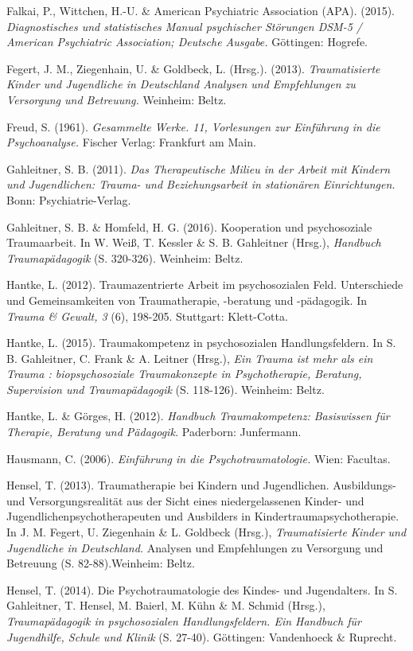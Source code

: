 \hang
Falkai, P., Wittchen, H.-U. \& American Psychiatric Association (APA). (2015). \textit{Diagnostisches und statistisches Manual psychischer Störungen DSM-5 / American Psychiatric Association; Deutsche Ausgabe.} G{\"o}ttingen: Hogrefe.

\hang
Fegert, J. M., Ziegenhain, U. \& Goldbeck, L. (Hrsg.). (2013). \textit{Traumatisierte Kinder und Jugendliche in Deutschland Analysen und Empfehlungen zu Versorgung und Betreuung.} Weinheim: Beltz.

\hang
Freud, S. (1961). \textit{Gesammelte Werke. 11, Vorlesungen zur Einführung in die Psychoanalyse.} Fischer Verlag: Frankfurt am Main.

\hang
Gahleitner, S. B. (2011). \textit{Das Therapeutische Milieu in der Arbeit mit Kindern und Jugendlichen: Trauma- und Beziehungsarbeit in stationären Einrichtungen.} Bonn: Psychiatrie-Verlag.

\hang
Gahleitner, S. B. \& Homfeld, H. G. (2016). Kooperation und psychosoziale Traumaarbeit. In W. Weiß, T. Kessler \& S. B. Gahleitner (Hrsg.), \textit{Handbuch Traumapädagogik} (S. 320-326). Weinheim: Beltz.

\hang
Hantke, L. (2012). Traumazentrierte Arbeit im psychosozialen Feld. Unterschiede und Gemeinsamkeiten von Traumatherapie, -beratung und -pädagogik. In \textit{Trauma \& Gewalt, 3} (6), 198-205. Stuttgart: Klett-Cotta.

\hang
Hantke, L. (2015). Traumakompetenz in psychosozialen Handlungsfeldern. In S. B. Gahleitner, C. Frank \& A. Leitner (Hrsg.), \textit{Ein Trauma ist mehr als ein Trauma : biopsychosoziale Traumakonzepte in Psychotherapie, Beratung, Supervision und Traumapädagogik} (S. 118-126). Weinheim: Beltz.

\hang
Hantke, L. \& Görges, H. (2012). \textit{Handbuch Traumakompetenz: Basiswissen für Therapie, Beratung und Pädagogik.} Paderborn: Junfermann.

\hang
Hausmann, C. (2006). \textit{Einführung in die Psychotraumatologie.} Wien: Facultas.

\hang
Hensel, T. (2013). Traumatherapie bei Kindern und Jugendlichen. Ausbildungs- und Versorgungsrealit{\"a}t aus der Sicht eines niedergelassenen Kinder- und Jugendlichenpsychotherapeuten und Ausbilders in Kindertraumapsychotherapie. In J. M. Fegert, U. Ziegenhain \& L. Goldbeck (Hrsg.), \textit{Traumatisierte Kinder und Jugendliche in Deutschland.} Analysen und Empfehlungen zu Versorgung und Betreuung (S. 82-88).Weinheim: Beltz.

\hang
Hensel, T. (2014). Die Psychotraumatologie des Kindes- und Jugendalters. In S. Gahleitner, T. Hensel, M. Baierl, M. K{\"u}hn \& M. Schmid (Hrsg.), \textit{Traumap{\"a}dagogik in psychosozialen Handlungsfeldern. Ein Handbuch f{\"u}r Jugendhilfe, Schule und Klinik} (S. 27-40). Göttingen: Vandenhoeck \& Ruprecht.

